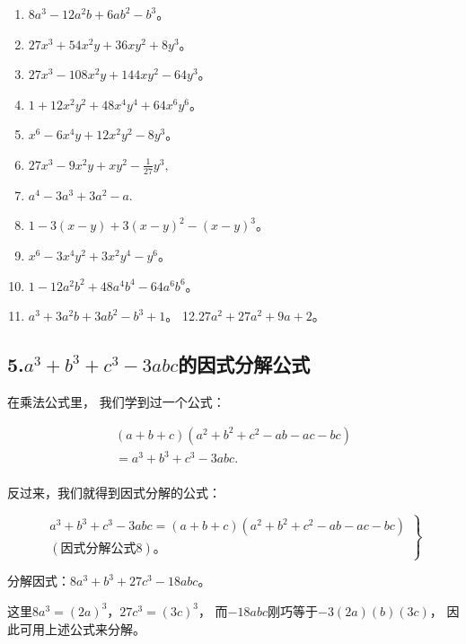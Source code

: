 \begin{enumerate}[start=1]
\item
  \(8a^{3} - 12a^{2}b + 6ab^{2} - b^{3}\)。
\item
  \(27x^{3} + 54x^{2}y + 36xy^{2} + 8y^{3}\)。
\item
  \(27x^{3} - 108x^{2}y + 144xy^{2} - 64y^{3}\)。
\item
  \(1 + 12x^{2}y^{2} + 48x^{4}y^{4} + 64x^{6}y^{6}\)。
\item
  \(x^{6} - 6x^{4}y + 12x^{2}y^{2} - 8y^{3}\)。
\item
  \(27x^{3} - 9x^{2}y + xy^{2} - \frac{1}{27} y^{3},\)
\item
  \(a^4 - 3a^3 + 3a^2 - a.\)
\item
  \(1 - 3(x - y) + 3(x - y)^{2} - (x - y)^{3}\)。
\item
  \(x^{6} - 3x^{4}y^{2} + 3x^{2}y^{4} - y^{6}\)。
\item
  \(1 - 12a^{2}b^{2} + 48a^{4}b^{4} - 64a^{6}b^{6}\)。
\item
  \(a^3 + 3a^2b + 3ab^2 - b^3 + 1\)。 12.\(27a^2 + 27a^2 + 9a + 2\)。
\end{enumerate}

\subsection{\texorpdfstring{5.\(a^3 + b^3 + c^3 - 3abc\)的因式分解公式}{5.a\^{}3 + b\^{}3 + c\^{}3 - 3abc的因式分解公式}}\label{a3-b3-c3---3abcux7684ux56e0ux5f0fux5206ux89e3ux516cux5f0f}

在乘法公式里， 我们学到过一个公式：

\[
\begin{array}{l} (a + b + c) \left(a ^{2} + b ^{2} + c ^{2} - a b - a c - b c\right) \\ = a ^{3} + b ^{3} + c ^{3} - 3 a b c. \\ \end{array}
\]

反过来，我们就得到因式分解的公式：

\[
\left. \begin{array}{c} a ^{3} + b ^{3} + c ^{3} - 3 a b c = (a + b + c) (a ^{2} + b ^{2} + c ^{2} - a b - a c - b c) \\ (\text{因式分解公式8})\text{。} \end{array} \right\}
\]

 分解因式：\(8a^{3} + b^{3} + 27c^{3} - 18abc\)。

 这里\(8a^{3} = (2a)^{3}\)，\(27c^{3} = (3c)^{3}\)，
而\(-18abc\)刚巧等于\(-3(2a)(b)(3c)\)， 因此可用上述公式来分解。

